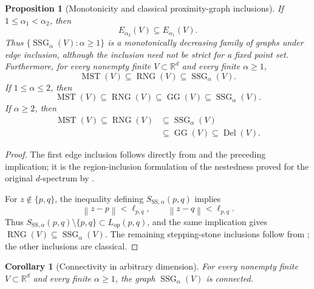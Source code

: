 \documentclass[a4paper,fleqn]{cas-dc}
\newtheorem{proposition}{Proposition}
\newtheorem{corollary}{Corollary}
\theoremstyle{definition}
\theoremstyle{remark}
\newcommand{\R}{\mathds{R}}
\newcommand{\norm}[1]{\left\lVert #1\right\rVert}
\newcommand{\ellpq}{\ell_{p,q}}
\newcommand{\0}{\mathbf{0}}
\DeclareMathOperator{\SSG}{SSG}
\DeclareMathOperator{\RNG}{RNG}
\DeclareMathOperator{\GG}{GG}
\DeclareMathOperator{\Del}{Del}
\DeclareMathOperator{\MST}{MST}
\begin{document}
\begin{proposition}[Monotonicity and classical proximity-graph inclusions]
\label{prop:inclusions}
If $1\leq\alpha_1<\alpha_2$, then
\begin{equation}\label{eq:ss-edge-monotonicity}
    E_{\alpha_2}(V)\subseteq E_{\alpha_1}(V).
\end{equation}
Thus $\{\SSG_\alpha(V):\alpha\geq1\}$ is a monotonically decreasing family
of graphs under edge inclusion, although the inclusion need not be strict for
a fixed point set.
Furthermore, for every nonempty finite $V\subset\R^d$ and every finite
$\alpha\geq1$,
\begin{equation}
    \MST(V)\subseteq\RNG(V)\subseteq\SSG_\alpha(V).
\end{equation}
If $1\leq\alpha\leq2$, then
\begin{equation}
    \MST(V)\subseteq\RNG(V)\subseteq\GG(V)
    \subseteq\SSG_\alpha(V).
\end{equation}
If $\alpha\geq2$, then
\begin{equation}\label{eq:tail-chain}
\begin{aligned}
\MST(V)\subseteq\RNG(V)
&\subseteq\SSG_\alpha(V)
\\
&\subseteq\GG(V)\subseteq\Del(V).
\end{aligned}
\end{equation}
\end{proposition}

\begin{proof}
The first edge inclusion follows directly from  and
the preceding implication; it is the region-inclusion formulation of the
nestedness proved for the original $d$-spectrum by
\citet{kannangara2018stepping,kannangara2019stepping}.

For $z\notin\{p,q\}$, the inequality defining
$S_{\mathrm{SS},\alpha}(p,q)$ implies
\begin{equation}
    \norm{z-p}<\ellpq,
    \qquad
    \norm{z-q}<\ellpq.
\end{equation}
Thus
$S_{\mathrm{SS},\alpha}(p,q)\setminus\{p,q\}
\subset L_{\mathrm{op}}(p,q)$,
and the same implication gives $\RNG(V)\subseteq\SSG_\alpha(V)$. The remaining
stepping-stone inclusions follow from
; the other inclusions are
classical.
\end{proof}

\begin{corollary}[Connectivity in arbitrary dimension]
\label{cor:graph-consequence}
For every nonempty finite \(V\subset\R^d\) and every finite
\(\alpha\geq1\),
the graph \(\SSG_\alpha(V)\) is connected.
\end{corollary}
\end{document}
